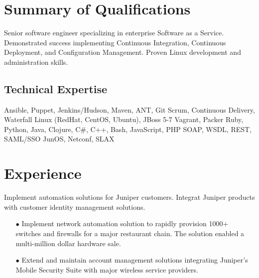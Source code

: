 \documentclass[12pt,letter,roman]{moderncv}
\begin{document}
\makecvtitle

\section{Summary of Qualifications}

Senior software engineer specializing in enterprise Software as a
Service. Demonstrated success implementing Continuous Integration, Continuous
Deployment, and Configuration Management.  Proven Linux development
and administration skills.

\subsection{Technical Expertise}

 { Ansible, Puppet, Jenkins/Hudson,
  Maven, ANT, Git }
 { Scrum, Continuous Delivery, Waterfall }
 { Linux (RedHat, CentOS, Ubuntu), JBoss 5-7 }
 { Vagrant, Packer }
 { Ruby, Python, Java, Clojure, C\#, C++, Bash, JavaScript, PHP }
 { SOAP, WSDL, REST, SAML/SSO }
 { JunOS, Netconf, SLAX }

\section{Experience}


Implement automation solutions for Juniper customers. Integrat
Juniper products with customer identity management solutions.

\begin{itemize}
  \item[$\bullet$] Implement network automation solution to rapidly provision
    1000+ switches and firewalls for a major restaurant chain.  The
    solution enabled a multi-million dollar hardware sale.

  \item[$\bullet$] Extend and maintain account management solutions
    integrating Juniper's Mobile Security Suite with major wireless
    service providers.

\end{itemize}

\end{document}
